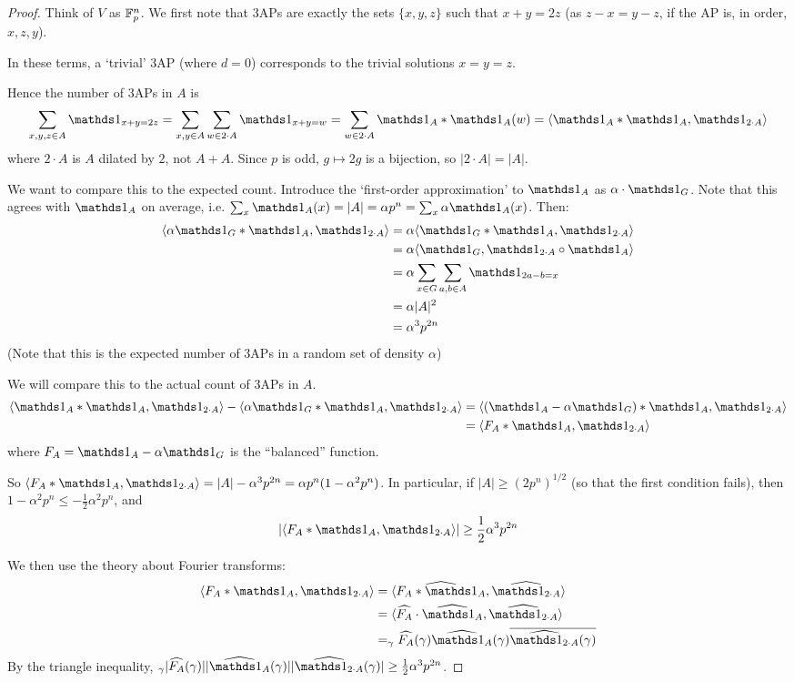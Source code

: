 \documentclass[10pt,a4paper]{article}
\let\E\relax
\DeclareMathOperator*{\E}{\raisebox{-0.45em}{\text{\huge $\mathds{E}$}}}
\begin{document}
\begin{proof}
  Think of $V$ as $\mathbb{F}_p^n$. We first note that 3APs are exactly the sets $\{x,y,z\}$ such that $x+y=2z$ (as $z-x = y-z$, if the AP is, in order, $x,z,y$).

  In these terms, a `trivial' 3AP (where $d=0$) corresponds to the trivial solutions $x=y=z$.

  Hence the number of 3APs in $A$ is
  \[\sum_{x,y,z \in A} \one_{x+y=2z} = \sum_{x,y \in A} \sum_{w \in 2\cdot A} \one_{x+y=w} = \sum_{w \in 2\cdot A} \one_A \ast \one_A(w) = \angle{\one_A \ast \one_A, \one_{2\cdot A}}\]
  where $2\cdot A$ is $A$ dilated by $2$, not $A+A$. Since $p$ is odd, $g \mapsto 2g$ is a bijection, so $|2\cdot A| = |A|$.

  We want to compare this to the expected count. Introduce the `first-order approximation' to $\one_A$ as $\alpha \cdot \one_G$. Note that this agrees with $\one_A$ on average, i.e. $\sum_x \one_A(x) = |A| = \alpha p^n = \sum_x \alpha \one_A(x)$. Then:
  \begin{align*}
    \angle{\alpha \one_G \ast \one_A, \one_{2\cdot A}} &= \alpha \angle{\one_G\ast \one_A, \one_{2\cdot A}}\\
    &= \alpha \angle{\one_G, \one_{2\cdot A} \circ \one_A}\\
    &= \alpha \sum_{x \in G}\sum_{a,b \in A} \one_{2a-b =x}\\
    &= \alpha|A|^2\\
    &= \alpha^3p^{2n}
  \end{align*}
  (Note that this is the expected number of 3APs in a random set of density $\alpha$)

  We will compare this to the actual count of 3APs in $A$.
  \begin{align*}
    \angle{\one_A\ast \one_A, \one_{2\cdot A}} - \angle{\alpha\one_G\ast \one_A, \one_{2\cdot A}} &= \angle{(\one_A-\alpha\one_G)\ast \one_A, \one_{2\cdot A}}\\
    &=\angle{F_A\ast \one_A, \one_{2\cdot A}}
  \end{align*}
  where $F_A = \one_A - \alpha\one_G$ is the ``balanced'' function.

  So $\angle{F_A\ast \one_A, \one_{2\cdot A}} = |A|-\alpha^3 p^{2n} = \alpha p^n(1-\alpha^2 p^n)$. In particular, if $|A| \geq (2p^n)^{1/2}$ (so that the first condition fails), then $1-\alpha^2p^n \leq -\frac{1}{2}\alpha^2p^n$, and
  \[|\angle{F_A \ast \one_A, \one_{2\cdot A}}| \geq \frac{1}{2}\alpha^3 p^{2n}\]

  We then use the theory about Fourier transforms:
  \begin{align*}
    \angle{F_A \ast \one_A, \one_{2\cdot A}} &= \angle{\widehat{F_A\ast \one_A}, \hat{\one_{2\cdot A}}}\\
    &= \angle{\hat{F_A}\cdot \hat{\one_A}, \hat{\one_{2\cdot A}}}\\
    &= \E_\gamma \hat{F_A}(\gamma)\hat{\one_A}(\gamma)\overline{\hat{\one_{2\cdot A}}(\gamma)}
  \end{align*}
  By the triangle inequality, $\E_\gamma |\hat{F_A}(\gamma)||\hat{\one_A}(\gamma)||\hat{\one_{2\cdot A}}(\gamma)| \geq \frac{1}{2}\alpha^3 p^{2n}$.


\end{proof}
\end{document}
